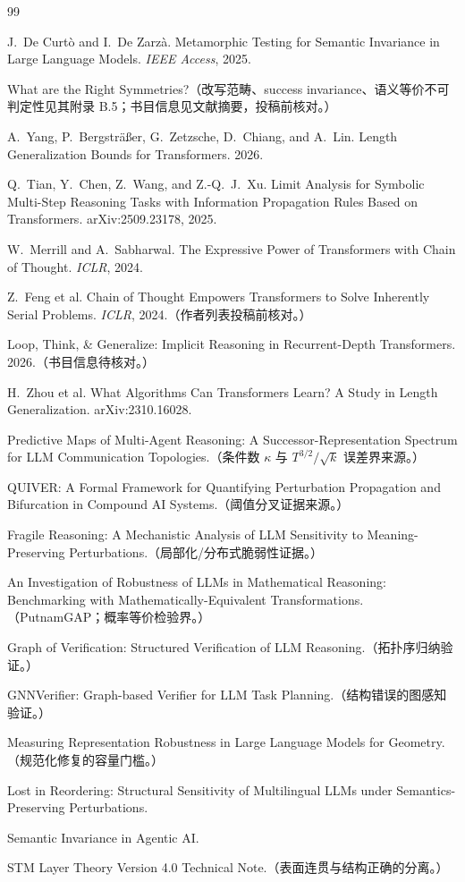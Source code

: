\documentclass[11pt]{ctexart}
\begin{document}
\begin{thebibliography}{99}

J.~De Curt\`o and I.~De Zarz\`a. Metamorphic Testing for Semantic Invariance in Large Language Models. \emph{IEEE Access}, 2025.

What are the Right Symmetries?（改写范畴、success invariance、语义等价不可判定性见其附录 B.5；书目信息见文献摘要，投稿前核对。）

A.~Yang, P.~Bergstr\"a\ss er, G.~Zetzsche, D.~Chiang, and A.~Lin. Length Generalization Bounds for Transformers. 2026.

Q.~Tian, Y.~Chen, Z.~Wang, and Z.-Q.~J.~Xu. Limit Analysis for Symbolic Multi-Step Reasoning Tasks with Information Propagation Rules Based on Transformers. arXiv:2509.23178, 2025.

W.~Merrill and A.~Sabharwal. The Expressive Power of Transformers with Chain of Thought. \emph{ICLR}, 2024.

Z.~Feng et al. Chain of Thought Empowers Transformers to Solve Inherently Serial Problems. \emph{ICLR}, 2024.（作者列表投稿前核对。）

Loop, Think, \& Generalize: Implicit Reasoning in Recurrent-Depth Transformers. 2026.（书目信息待核对。）

H.~Zhou et al. What Algorithms Can Transformers Learn? A Study in Length Generalization. arXiv:2310.16028.

Predictive Maps of Multi-Agent Reasoning: A Successor-Representation Spectrum for LLM Communication Topologies.（条件数 $\kappa$ 与 $T^{3/2}/\sqrt{k}$ 误差界来源。）

QUIVER: A Formal Framework for Quantifying Perturbation Propagation and Bifurcation in Compound AI Systems.（阈值分叉证据来源。）

Fragile Reasoning: A Mechanistic Analysis of LLM Sensitivity to Meaning-Preserving Perturbations.（局部化/分布式脆弱性证据。）

An Investigation of Robustness of LLMs in Mathematical Reasoning: Benchmarking with Mathematically-Equivalent Transformations.（PutnamGAP；概率等价检验界。）

Graph of Verification: Structured Verification of LLM Reasoning.（拓扑序归纳验证。）

GNNVerifier: Graph-based Verifier for LLM Task Planning.（结构错误的图感知验证。）

Measuring Representation Robustness in Large Language Models for Geometry.（规范化修复的容量门槛。）

Lost in Reordering: Structural Sensitivity of Multilingual LLMs under Semantics-Preserving Perturbations.

Semantic Invariance in Agentic AI.

STM Layer Theory Version 4.0 Technical Note.（表面连贯与结构正确的分离。）

\end{thebibliography}
\end{document}
